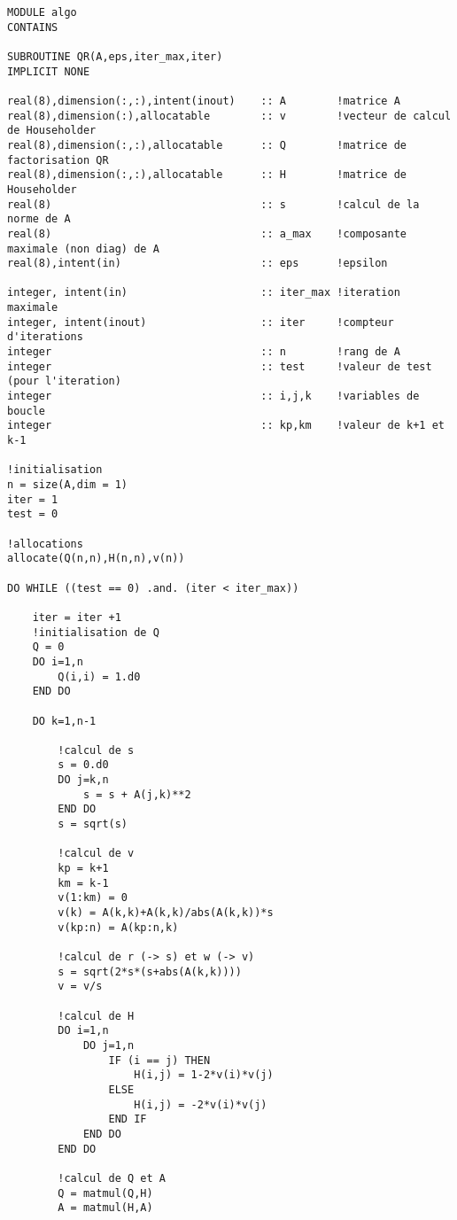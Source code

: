 \documentclass{report}
\begin{document}
\begin{small}
\begin{verbatim}
MODULE algo
CONTAINS

SUBROUTINE QR(A,eps,iter_max,iter)
IMPLICIT NONE

real(8),dimension(:,:),intent(inout)    :: A        !matrice A
real(8),dimension(:),allocatable        :: v        !vecteur de calcul de Householder
real(8),dimension(:,:),allocatable      :: Q        !matrice de factorisation QR
real(8),dimension(:,:),allocatable      :: H        !matrice de Householder
real(8)                                 :: s        !calcul de la norme de A
real(8)                                 :: a_max    !composante maximale (non diag) de A
real(8),intent(in)                      :: eps      !epsilon

integer, intent(in)                     :: iter_max !iteration maximale
integer, intent(inout)                  :: iter     !compteur d'iterations
integer                                 :: n        !rang de A
integer                                 :: test     !valeur de test (pour l'iteration)
integer                                 :: i,j,k    !variables de boucle
integer                                 :: kp,km    !valeur de k+1 et k-1

!initialisation
n = size(A,dim = 1)
iter = 1
test = 0

!allocations
allocate(Q(n,n),H(n,n),v(n))

DO WHILE ((test == 0) .and. (iter < iter_max))

    iter = iter +1
    !initialisation de Q
    Q = 0
    DO i=1,n
        Q(i,i) = 1.d0
    END DO

    DO k=1,n-1

        !calcul de s
        s = 0.d0
        DO j=k,n
            s = s + A(j,k)**2
        END DO
        s = sqrt(s)

        !calcul de v
        kp = k+1
        km = k-1
        v(1:km) = 0
        v(k) = A(k,k)+A(k,k)/abs(A(k,k))*s
        v(kp:n) = A(kp:n,k)

        !calcul de r (-> s) et w (-> v)
        s = sqrt(2*s*(s+abs(A(k,k))))
        v = v/s

        !calcul de H
        DO i=1,n
            DO j=1,n
                IF (i == j) THEN
                    H(i,j) = 1-2*v(i)*v(j)
                ELSE
                    H(i,j) = -2*v(i)*v(j)
                END IF
            END DO
        END DO

        !calcul de Q et A
        Q = matmul(Q,H)
        A = matmul(H,A)


\end{verbatim}
\end{small}
\end{document}
